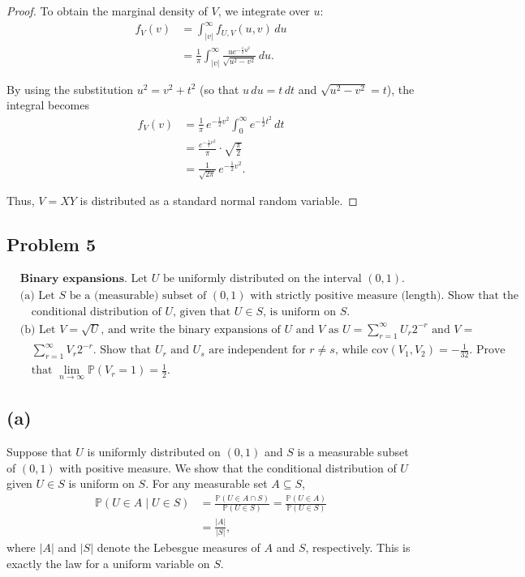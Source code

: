 \documentclass[letterpaper, 11pt]{article}
\newcommand{\1}{\mathds{1}}	%
\theoremstyle{definition}
\begin{document}
\begin{proof}
To obtain the marginal density of \(V\), we integrate over \(u\):
\begin{align*}
f_V(v) &= \int_{|v|}^{\infty} f_{U,V}(u,v) \, du \\
&= \frac{1}{\pi}\int_{|v|}^{\infty} \frac{u e^{-\frac{1}{2}u^2}}{\sqrt{u^2-v^2}} \, du.
\end{align*}

By using the substitution \(u^2 = v^2 + t^2\) (so that \(u\,du = t\,dt\) and \(\sqrt{u^2-v^2} = t\)), the integral becomes
\begin{align*}
f_V(v) &= \frac{1}{\pi}\,e^{-\frac{1}{2}v^2}\int_{0}^{\infty} e^{-\frac{1}{2}t^2}\, dt \\
&= \frac{e^{-\frac{1}{2}v^2}}{\pi}\cdot \sqrt{\frac{\pi}{2}} \\
&= \frac{1}{\sqrt{2\pi}}\,e^{-\frac{1}{2}v^2}.
\end{align*}

Thus, \(V = XY\) is distributed as a standard normal random variable.
    
\end{proof}
\subsection*{Problem 5}
\begin{align*}
    & \textbf{Binary expansions.} \text{ Let $U$ be uniformly distributed on the interval $(0, 1)$.} \\
    & \text{(a) Let $S$ be a (measurable) subset of $(0, 1)$ with strictly positive measure (length). Show that the} \\
    & \quad \text{conditional distribution of $U$, given that $U \in S$, is uniform on $S$.} \\
    & \text{(b) Let $V = \sqrt{U}$, and write the binary expansions of $U$ and $V$ as $U = \sum_{r=1}^{\infty} U_r 2^{-r}$ and $V =$ } \\
    & \quad \sum_{r=1}^{\infty} V_r 2^{-r}. \text{ Show that $U_r$ and $U_s$ are independent for $r \neq s$, while $\text{cov}(V_1, V_2) = -\frac{1}{32}$. Prove} \\
    & \quad \text{that $\lim_{n \to \infty} \mathbb{P}(V_r = 1) = \frac{1}{2}$.}
\end{align*}
\subsection*{(a)}

Suppose that \(U\) is uniformly distributed on \((0,1)\) and \(S\) is a measurable subset of \((0,1)\) with positive measure. We show that the conditional distribution of \(U\) given \(U\in S\) is uniform on \(S\). For any measurable set \(A\subseteq S\), 
\begin{align*}
\mathbb{P}(U\in A \mid U\in S) 
  &= \frac{\mathbb{P}(U\in A\cap S)}{\mathbb{P}(U\in S)}
   = \frac{\mathbb{P}(U\in A)}{\mathbb{P}(U\in S)} \\
  &= \frac{|A|}{|S|},
\end{align*}
where \(|A|\) and \(|S|\) denote the Lebesgue measures of \(A\) and \(S\), respectively. This is exactly the law for a uniform variable on \(S\).
\end{document}

